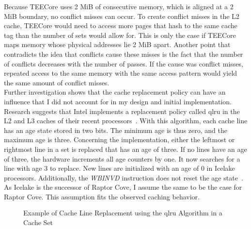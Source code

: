 Because TEECore uses 2 MiB of consecutive memory, which is aligned at a 2 MiB
boundary, no conflict misses can occur. To create conflict misses in the L2
cache, TEECore would need to access more pages that hash to the same cache tag
than the number of sets would allow for. This is only the case if TEECore maps
memory whose physical addresses lie 2 MiB apart. Another point that contradicts
the idea that conflicts cause these misses is the fact that the number of
conflicts decreases with the number of passes. If the cause was conflict misses,
repeated access to the same memory with the same access pattern would yield the
same amount of conflict misses.\\

Further investigation shows that the cache replacement policy can have an
influence that I did not account for in my design and initial implementation.
Research suggests that Intel implements a replacement policy called \gls{qlru}
in the L2 and L3 caches of their recent processors~\cite{briongos2020reload+,
Abel20b}. With this algorithm, each cache line has an age state stored in two
bits. The minimum age is thus zero, and the maximum age is three. Concerning the
implementation, either the leftmost or rightmost line in a set is replaced that
has an age of three. If no lines have an age of three, the hardware increments
all age counters by one. It now searches for a line with age 3 to replace. New
lines are initialized with an age of 0 in Icelake processors. Additionally, the
\textit{WBINVD} instruction does not reset the age state~\cite{Abel20b}. As
Icelake is the successor of Raptor Cove, I assume the same to be the case for
Raptor Cove. This assumption fits the observed caching behavior.\\

\begin{figure}
  \begin{center}
    
    \caption{Example of Cache Line Replacement using the \gls{qlru} Algorithm in a Cache Set}
    \label{fig:50:qlru}
  \end{center}
\end{figure}

